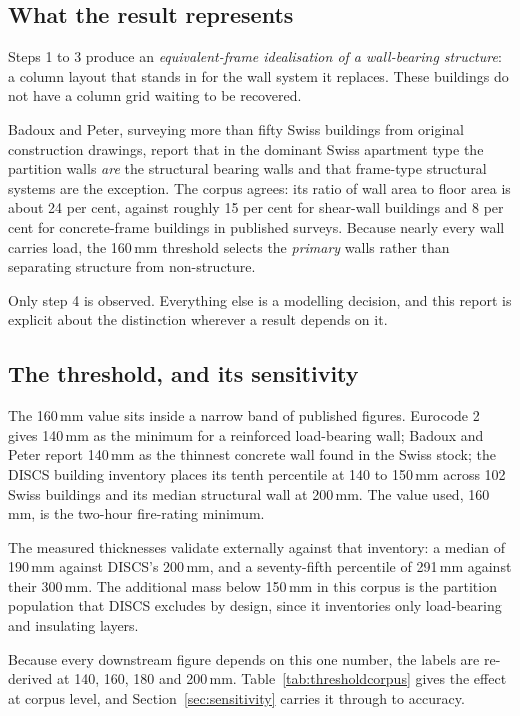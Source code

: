 \subsection{What the result represents}

Steps 1 to 3 produce an \emph{equivalent-frame idealisation of a
wall-bearing structure}: a column layout that stands in for the wall
system it replaces. These buildings do not have a column grid waiting to
be recovered.

Badoux and Peter, surveying more than fifty Swiss buildings from original
construction drawings, report that in the dominant Swiss apartment type
the partition walls \emph{are} the structural bearing walls and that
frame-type structural systems are the exception. The corpus agrees: its
ratio of wall area to floor area is about 24 per cent, against roughly 15
per cent for shear-wall buildings and 8 per cent for concrete-frame
buildings in published surveys. Because nearly every wall carries load,
the 160\,mm threshold selects the \emph{primary} walls rather than
separating structure from non-structure.

Only step 4 is observed. Everything else is a modelling decision, and this
report is explicit about the distinction wherever a result depends on it.

\subsection{The threshold, and its sensitivity}

The 160\,mm value sits inside a narrow band of published figures. Eurocode
2 gives 140\,mm as the minimum for a reinforced load-bearing wall; Badoux
and Peter report 140\,mm as the thinnest concrete wall found in the Swiss
stock; the DISCS building inventory places its tenth percentile at 140 to
150\,mm across 102 Swiss buildings and its median structural wall at
200\,mm. The value used, 160\,mm, is the two-hour fire-rating minimum.

The measured thicknesses validate externally against that inventory: a
median of 190\,mm against DISCS's 200\,mm, and a seventy-fifth percentile
of 291\,mm against their 300\,mm. The additional mass below 150\,mm in
this corpus is the partition population that DISCS excludes by design,
since it inventories only load-bearing and insulating layers.

Because every downstream figure depends on this one number, the labels are
re-derived at 140, 160, 180 and 200\,mm. Table~\ref{tab:thresholdcorpus}
gives the effect at corpus level, and Section~\ref{sec:sensitivity}
carries it through to accuracy.

